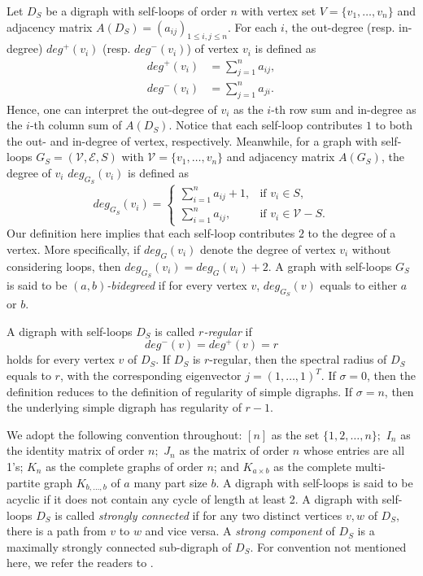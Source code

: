 \documentclass[12pt,a4paper,reqno]{amsart}
\numberwithin{equation}{section}
\theoremstyle{plain}
\theoremstyle{definition}
\newcommand{\<}{\langle}
\renewcommand{\>}{\rangle}
\newcommand{\cE}{{\mathcal E}}
\newcommand{\cV}{{\mathcal V}}
\begin{document}
    Let $D_S$ be a digraph with self-loops of order $n$ with vertex set $V=\{v_1,\ldots,v_n\}$ and adjacency matrix $A(D_S)=(a_{ij})_{1 \leq i,j \leq n}$. For each $i$, the out-degree (resp. in-degree) $deg^+(v_i)$ (resp. $deg^-(v_i)$) of vertex $v_i$ is defined as 
    \begin{align*}
        deg^+ (v_i) &= \sum_{j=1}^n a_{ij}, \\
        deg^- (v_i) &= \sum_{j=1}^n a_{ji}.
    \end{align*}
    Hence, one can interpret the out-degree of $v_i$ as the $i$-th row sum and in-degree as the $i$-th column sum of $A(D_S)$. Notice that each self-loop contributes $1$ to both the out- and in-degree of vertex, respectively. Meanwhile, for a graph with self-loops $G_S=(\cV, \cE, S)$ with $\cV=\{v_1,\ldots,v_n\}$ and adjacency matrix $A(G_S)$, the degree of $v_i$ $deg_{G_S}(v_i)$ is defined as 
    \[
    deg_{G_S}(v_i)=
    \begin{cases}
	\sum_{i=1}^n a_{ij} +1, &\text{if $v_i\in S$,}\\
	\sum_{i=1}^n a_{ij}, &\text{if $v_i \in \cV-S$.}
    \end{cases}
    \]
    Our definition here implies that each self-loop contributes $2$ to the degree of a vertex. More specifically, if $deg_G(v_i)$ denote the degree of vertex $v_i$ without considering loops, then $deg_{G_S}(v_i)=deg_{G}(v_i)+2$. A graph with self-loops $G_S$ is said to be \textit{$(a,b)$-bidegreed} if for every vertex $v$, $deg_{G_S}(v)$ equals to either $a$ or $b$.

    A digraph with self-loops $D_S$ is called \textit{$r$-regular} if 
    \begin{equation}
    \label{eq:regular1}
    deg^-(v)=deg^+(v)=r
    \end{equation}
    holds for every vertex $v$ of $D_S$.    
    If $D_S$ is $r$-regular, then the spectral radius of $D_S$ equals to $r$, with the corresponding eigenvector $j=(1,\ldots,1)^T$. If $\sigma=0$, then the definition reduces to the definition of regularity of simple digraphs. If $\sigma=n$, then the underlying simple digraph has regularity of $r-1$. 
    
    We adopt the following convention throughout: $[n]$ as the set $\{1,2,\ldots, n\};$  $I_n$ as the identity matrix of order $n;$ $J_n$ as the matrix of order $n$ whose entries are all 1's; $K_n$ as the complete graphs of order $n$; and $K_{a \times b}$ as the complete multi-partite graph $K_{b,\ldots, b}$ of $a$ many part size $b$. A digraph with self-loops is said to be acyclic if it does not contain any cycle of length at least 2. A digraph with self-loops $D_S$ is called \textit{strongly connected} if for any two distinct vertices $v,w$ of $D_S$, there is a path from $v$ to $w$ and vice versa. A \textit{strong component} of $D_S$ is a maximally strongly connected sub-digraph of $D_S$. For convention not mentioned here, we refer the readers to \cite{cvetkovic1995spectra}.
\end{document}
